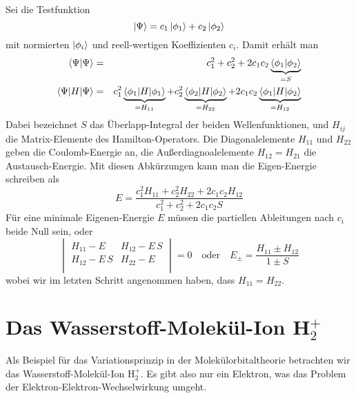 Sei die Testfunktion
\begin{equation}
 \ket{\Psi} = c_1 \ket{\phi_1} + c_2 \ket{\phi_2}
\end{equation}
mit normierten  $\ket{\phi_i}$ und reell-wertigen Koeffizienten $c_i$. Damit erhält man
\begin{eqnarray}
\braket{\Psi | \Psi}  &= & c_1^2 + c_2^2  + 2 c_1 c_2 \underbrace{\braket{\phi_1 | \phi_2}}_{= S}\\
\braket{\Psi |  H | \Psi} &=& c_1^2 \underbrace{\braket{\phi_1 |  H | \phi_1 }}_{= H_{11}} +
										c_2^2 \underbrace{\braket{\phi_2 |  H | \phi_2 }}_{= H_{22}} +
								2 c_1 c_2 \underbrace{\braket{\phi_1 |  H | \phi_2 }}_{= H_{12}} 
\end{eqnarray}
Dabei bezeichnet $S$ das Überlapp-Integral der beiden Wellenfunktionen, und $H_{ij}$ die Matrix-Elemente des Hamilton-Operators. Die Diagonalelemente $H_{11}$ und $H_{22}$ geben die Coulomb-Energie an, die Außerdiagnoalelemente $H_{12} = H_{21}$ die Austausch-Energie. Mit diesen Abkürzungen kann man die Eigen-Energie schreiben als
\begin{equation}
  E = \frac{c_1^2 H_{11} + c_2^2 H_{22} + 2 c_1 c_2 H_{12}}{c_1^2 + c_2^2 + 2 c_1 c_2 S}
\end{equation}
Für eine minimale Eigenen-Energie $E$ müssen die partiellen Ableitungen nach $c_i$ beide Null sein, oder
\begin{equation}
 \begin{vmatrix}
   H_{11} - E & H_{12} - E \, S \\  H_{12} - E \, S & H_{22} - E \\
 \end{vmatrix}
= 0
\quad
\text{oder} \quad
E_\pm = \frac{H_{11} \pm H_{12}}{1 \pm S}
\end{equation}
wobei wir im letzten Schritt angenommen haben, dass $H_{11} = H_{22}$.

\section{Das Wasserstoff-Molekül-Ion H$_2^+$}

Als Beispiel für das Variationsprinzip in der Molekülorbitaltheorie betrachten wir das Wasserstoff-Molekül-Ion H$_2^+$. Es gibt also nur ein Elektron, was das Problem der Elektron-Elektron-Wechselwirkung umgeht.

